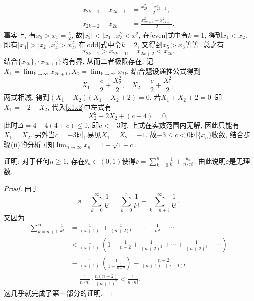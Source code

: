 \begin{quiza}
\begin{solution}
\begin{asparaenum}[\bfseries (i)]
\begin{align}
x_{2k+1}-x_{2k-1}&=\frac{x_{2k}^2-x_{2k-2}^2}{2},\tag{$\blacklozenge$}\label{odd}\\
x_{2k+2}-x_{2k}&=\frac{x_{2k+1}^2-x_{2k-1}^2}{2}.\tag{$\Diamond$}\label{even}
\end{align}
事实上, 有\(x_3>x_1=\frac{c}{2}\), 故\(|x_3|<|x_1|,x_3^2<x_1^2\), 在\eqref{even}式中令\(k=1\), 得到\(x_4<x_2\), 即有\(|x_4|>|x_2|,x_4^2>x_2^2\), 在\eqref{odd}式中令\(k=2\), 又得到\(x_5>x_3\)等等. 总之有\[x_{2k+1}>x_{2k-1},\quad x_{2k+2}<x_{2k}.\]结合\(\{x_{2k}\},\{x_{2k+1}\}\)均有界, 从而二者极限存在, 记\(X_1=\lim_{k\rightarrow\infty}x_{2k+1},X_2=\lim_{k\rightarrow\infty}x_{2k}\). 结合题设递推公式得到
\begin{equation}\tag{$\spadesuit$}\label{x1x2}
X_1=\frac{c}{2}+\frac{X_2^2}{2},\quad X_2=\frac{c}{2}+\frac{X_1^2}{2},
\end{equation}
两式相减, 得到\((X_1-X_2)(X_1+X_2+2)=0\). 若\(X_1+X_2+2=0\), 即\(X_1=-2-X_2\), 代入\eqref{x1x2}中左式有\[X_2^2+2X_2+(c+4)=0,\]此时\(\Delta=4-4(4+c)\leqslant 0\), 即\(c<-3\)时, 上式在实数范围内无解, 因此只能有\(X_1=X_2\). 另外当\(c=-3\)时, 易见\(X_1=X_2=-1\). 故\(-3\leqslant c<0\)时\(\{x_n\}\)收敛, 结合步骤(ii)的分析可知\(\lim_{n\rightarrow\infty}x_n=1-\sqrt{1-c}.\)\qedhere
\end{asparaenum}
\end{solution}
\woe 证明: 对于任何\(n\geqslant 1\), 存在\(\theta_n\in (0,1)\)使得\(\ee=\sum_{k=0}^{n}\frac{1}{k!}+\frac{\theta_n}{n\cdot n!}\). 由此说明\(\ee\)是无理数.
\begin{proof}
由于\[\ee=\sum_{k=0}^{\infty}\frac{1}{k!}=\sum_{k=0}^{n}\frac{1}{k!}+\sum_{k=n+1}^{\infty}\frac{1}{k!}.\]又因为\[\begin{split}
      \sum_{k=n+1}^{\infty}\frac{1}{k!}&=\frac{1}{(n+1)!}+\frac{1}{(n+2)!}+\cdots+\frac{1}{m!}+\cdots\\&<\frac{1}{(n+1)!}\left(1+\frac{1}{n+2}+\frac{1}{(n+2)^2}+\cdots+\frac{1}{(n+2)^k}+\cdots\right)\\&=\frac{1}{(n+1)!}\left(\frac{1}{1-\frac{1}{n+2}}\right)=\frac{n+2}{(n+1)\cdot(n+1)!}\\&=\frac{1}{n\cdot n!}\cdot\frac{n(n+2)}{(n+1)^2}<\frac{1}{n\cdot n!}.
    \end{split}\]这几乎就完成了第一部分的证明.
    

\end{proof}
\end{quiza}
